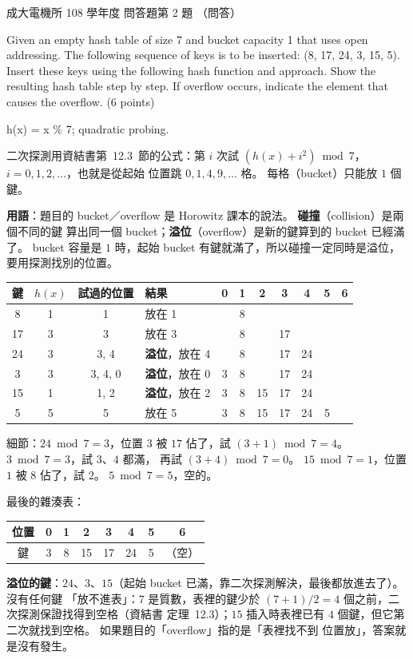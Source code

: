 \begin{pastexam}[label={px:ncku-108-ee-ds-03}]{成大電機所 108 學年度 問答題第 2 題}
（問答）

Given an empty hash table of size 7 and bucket capacity 1 that uses open addressing. The following
sequence of keys is to be inserted: (8, 17, 24, 3, 15, 5). Insert these keys using the following
hash function and approach. Show the resulting hash table step by step. If overflow occurs,
indicate the element that causes the overflow. (6 points)

\qquad h(x) = x \% 7; quadratic probing.
\end{pastexam}

\begin{pastsoln}
二次探測用資結書第~12.3~節的公式：第 $i$ 次試 $(h(x) + i^2) \bmod 7$，$i = 0, 1, 2, \ldots$，也就是從起始
位置跳 $0, 1, 4, 9, \ldots$ 格。 每格（bucket）只能放 $1$ 個鍵。

\textbf{用語}：題目的 bucket／overflow 是 Horowitz 課本的說法。 \textbf{碰撞}（collision）是兩個不同的鍵
算出同一個 bucket；\textbf{溢位}（overflow）是新的鍵算到的 bucket 已經滿了。 bucket 容量是 $1$ 時，起始
bucket 有鍵就滿了，所以碰撞一定同時是溢位，要用探測找別的位置。

\begin{center}
\small
\begin{tabular}{cccl*{7}{c}}
\toprule
鍵 & $h(x)$ & 試過的位置 & 結果 & 0 & 1 & 2 & 3 & 4 & 5 & 6 \\
\midrule
8 & 1 & 1 & 放在 1 & & 8 & & & & & \\
17 & 3 & 3 & 放在 3 & & 8 & & 17 & & & \\
24 & 3 & 3, 4 & \textbf{溢位}，放在 4 & & 8 & & 17 & 24 & & \\
3 & 3 & 3, 4, 0 & \textbf{溢位}，放在 0 & 3 & 8 & & 17 & 24 & & \\
15 & 1 & 1, 2 & \textbf{溢位}，放在 2 & 3 & 8 & 15 & 17 & 24 & & \\
5 & 5 & 5 & 放在 5 & 3 & 8 & 15 & 17 & 24 & 5 & \\
\bottomrule
\end{tabular}
\end{center}
細節：$24 \bmod 7 = 3$，位置 $3$ 被 $17$ 佔了，試 $(3 + 1) \bmod 7 = 4$。 $3 \bmod 7 = 3$，試 $3$、$4$ 都滿，
再試 $(3 + 4) \bmod 7 = 0$。 $15 \bmod 7 = 1$，位置 $1$ 被 $8$ 佔了，試 $2$。 $5 \bmod 7 = 5$，空的。

最後的雜湊表：
\begin{center}
\begin{tabular}{c|ccccccc}
位置 & 0 & 1 & 2 & 3 & 4 & 5 & 6 \\
\hline
鍵 & 3 & 8 & 15 & 17 & 24 & 5 & （空） \\
\end{tabular}
\end{center}

\textbf{溢位的鍵}：$24$、$3$、$15$（起始 bucket 已滿，靠二次探測解決，最後都放進去了）。 沒有任何鍵
「放不進表」：$7$ 是質數，表裡的鍵少於 $(7+1)/2 = 4$ 個之前，二次探測保證找得到空格（資結書
定理~12.3）；$15$ 插入時表裡已有 $4$ 個鍵，但它第二次就找到空格。 如果題目的「overflow」指的是「表裡找不到
位置放」，答案就是沒有發生。
\end{pastsoln}
